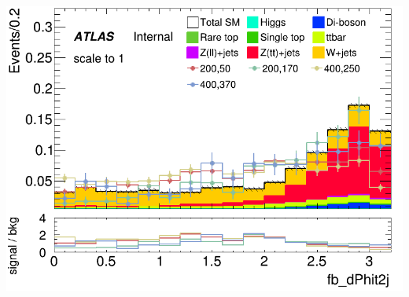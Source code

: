 \documentclass[usenames,dvipsnames]{beamer}
\begin{document}
\begin{frame}
\begin{minipage}{0.32\textwidth}
        \includegraphics[width=\textwidth]{graphics/HH_met_sig/HH_fb_dPhit2j_norm.png}
    \end{minipage}
    
    \vspace{0.5cm} %


\end{frame}
\end{document}
